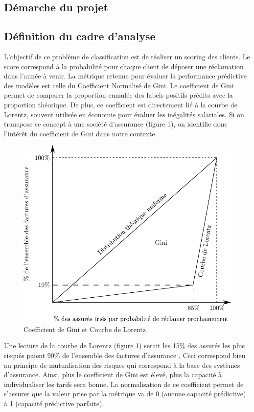 \documentclass[french]{article}
\begin{document}
\begin{multicols}{2}
\section{Démarche du projet}

\subsection{Définition du cadre d'analyse}

L'objectif de ce problème de classification est de réaliser un scoring des clients. Le score correspond à la probabilité pour chaque client de déposer une réclamation dans l'année à venir. La métrique retenue pour évaluer la performance prédictive des modèles est celle du Coefficient Normalisé de Gini. Le coefficient de Gini permet de comparer la proportion cumulée des labels positifs prédits avec la proportion théorique. De plus, ce coefficient est directement lié à la courbe de Lorentz, souvent utilisée en économie pour évaluer les inégalités salariales. Si on transpose ce concept à une société d'assurance (figure 1), on identifie donc l'intérêt du coefficient de Gini dans notre contexte.


\begin{figure}[H] \centering
  \includegraphics[width = \columnwidth]{img/gini}
  \caption{Coefficient de Gini et Courbe de Lorentz}
\end{figure}


Une lecture de la courbe de Lorentz (figure 1) serait \og les 15\% des assurés les plus risqués paient 90\% de l'ensemble des factures d'assurance \fg{}. Ceci correspond bien au principe de mutualisation des risques qui correspond à la base des systèmes d'assurance. Ainsi, plus le coefficient de Gini est élevé, plus la capacité à individualiser les tarifs sera bonne. La normalisation de ce coefficient permet de s'assurer que la valeur prise par la métrique va de 0 (aucune capacité prédictive) à 1 (capacité prédictive parfaite).


\end{multicols}
\end{document}
